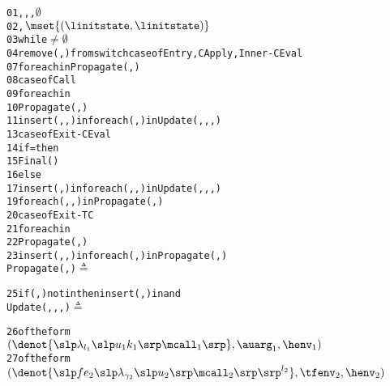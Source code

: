\documentclass{LMCS}
\theoremstyle{definition} \newtheorem{property}[thm]{Property}
\begin{document}
\begin{figure}[!t]
\newcommand{\tmphack}
           {\eh{\begin{cases}
                 \tfenv_2\onemap{f}{\mset{\denot{\slp\lambda_{l_3}\slp\mbox{}u_3 \; k_3\srp \;\mcall_3\srp}}} & \instack{l_2, f} \\ 
                 \tfenv_2 & \inheap{l_2, f} \lor \islam{f} 
           \end{cases}}}
{\footnotesize
\begin{alltt}
          01    \summary, \callers, \tcallers, \finals \assgn \(\emptyset\)
          02    \seen, \work \assgn \(\mset{(\linitstate, \linitstate)}\)
          03    while \work \(\neq \emptyset\)
          04      remove (\lstato, \lstatw) from       switch         case \lstatw of Entry, CApply, Inner-CEval
          07          for each \lstath in \succ{\lstatw} Propagate(\lstato, \lstath)
          08        case \lstatw of Call
          09          for each \lstath in \succ{\lstatw}
          10            Propagate(\lstath, \lstath)
          11            insert (\lstato, \lstatw, \lstath) in             for each (\lstath, \lstatf) in \summary  Update(\lstato, \lstatw, \lstath, \lstatf)
          13        case \lstatw of Exit-CEval
          14          if \lstato = \linitstate then
          15            Final(\lstatw)
          16          else
          17            insert (\lstato, \lstatw) in             for each (\lstath, \lstatf, \lstato) in \callers  Update(\lstath, \lstatf, \lstato, \lstatw)
          19            for each (\lstath, \lstatf, \lstato) in \tcallers Propagate(\lstath, \lstatw)
          20        case \lstatw of Exit-TC
          21          for each \lstath in \succ{\lstatw}
          22            Propagate(\lstath, \lstath)
          23            insert (\lstato, \lstatw, \lstath) in             for each (\lstath, \lstatf) in \summary Propagate(\lstato, \lstatf)
                Propagate(\lstato, \lstatw) \(\triangleq\) \rule{0cm}{0.45cm}
          25      if (\lstato, \lstatw) not in \seen then insert (\lstato, \lstatw) in \seen and \work
                Update(\lstato, \lstatw, \lstath, \lstatf) \(\triangleq\)  \rule{0cm}{0.45cm}
          26      \lstato of the form  \((\denot{\slp\lambda\sb{l\sb{1}}\slp\mbox{}u\sb{1} k\sb{1}\srp \mcall\sb{1}\srp} , \auarg\sb{1}, \henv\sb{1})\)
          27      \lstatw of the form  \((\denot{\slp\mbox{}f e\sb{2} \slp\lambda\sb{\gamma\sb{2}} \slp\mbox{}u\sb{2}\srp \mcall\sb{2}\srp\srp\sp{l\sb{2}}}, \tfenv\sb{2}, \henv\sb{2})\)

\end{alltt}}
\end{figure}
\end{document}
